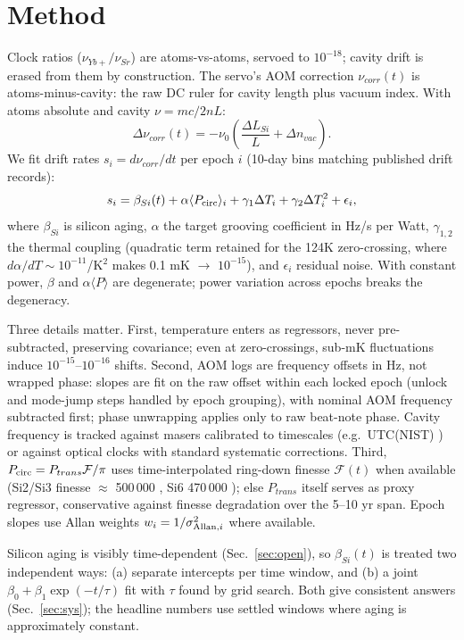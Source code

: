 \documentclass[11pt, a4paper]{article}
\begin{document}
\section{Method}
Clock ratios ($\nu_{Yb+}/\nu_{Sr}$) are atoms-vs-atoms, servoed to $10^{-18}$; cavity drift is erased from them by construction. The servo's AOM correction $\nu_{corr}(t)$ is atoms-minus-cavity: the raw DC ruler for cavity length plus vacuum index. With atoms absolute and cavity $\nu=mc/2nL$:
\begin{equation}
\Delta\nu_{corr}(t) = -\nu_0\left(\frac{\Delta L_{Si}}{L}+\Delta n_{vac}\right).
\end{equation}
We fit drift rates $s_i=d\nu_{corr}/dt$ per epoch $i$ (10-day bins matching published drift records):
\begin{equation}
s_i = \beta_{Si}(t) + \alpha \langle P_{\rm circ}\rangle_i + \gamma_1\Delta T_i + \gamma_2\Delta T_i^2 + \epsilon_i,
\label{eq:model}
\end{equation}
where $\beta_{Si}$ is silicon aging, $\alpha$ the target grooving coefficient in Hz/s per Watt, $\gamma_{1,2}$ the thermal coupling (quadratic term retained for the 124K zero-crossing, where $d\alpha/dT\sim10^{-11}$/K$^2$ makes 0.1 mK $\to$ $10^{-15}$), and $\epsilon_i$ residual noise. With constant power, $\beta$ and $\alpha\langle P\rangle$ are degenerate; power variation across epochs breaks the degeneracy.

Three details matter. First, temperature enters as regressors, never pre-subtracted, preserving covariance; even at zero-crossings, sub-mK fluctuations induce $10^{-15}$--$10^{-16}$ shifts. Second, AOM logs are frequency offsets in Hz, not wrapped phase: slopes are fit on the raw offset within each locked epoch (unlock and mode-jump steps handled by epoch grouping), with nominal AOM frequency subtracted first; phase unwrapping applies only to raw beat-note phase. Cavity frequency is tracked against masers calibrated to timescales (e.g.\ UTC(NIST) \cite{robinson2019}) or against optical clocks with standard systematic corrections. Third, $P_{\rm circ}=P_{trans}\mathcal{F}/\pi$ uses time-interpolated ring-down finesse $\mathcal{F}(t)$ when available (Si2/Si3 finesse $\approx$ 500\,000 \cite{matei2017}, Si6 470\,000 \cite{lee2026}); else $P_{trans}$ itself serves as proxy regressor, conservative against finesse degradation over the 5--10 yr span. Epoch slopes use Allan weights $w_i=1/\sigma_{{\rm Allan},i}^2$ where available.

Silicon aging is visibly time-dependent (Sec.~\ref{sec:open}), so $\beta_{Si}(t)$ is treated two independent ways: (a) separate intercepts per time window, and (b) a joint $\beta_0+\beta_1\exp(-t/\tau)$ fit with $\tau$ found by grid search. Both give consistent answers (Sec.~\ref{sec:sys}); the headline numbers use settled windows where aging is approximately constant.
\end{document}
